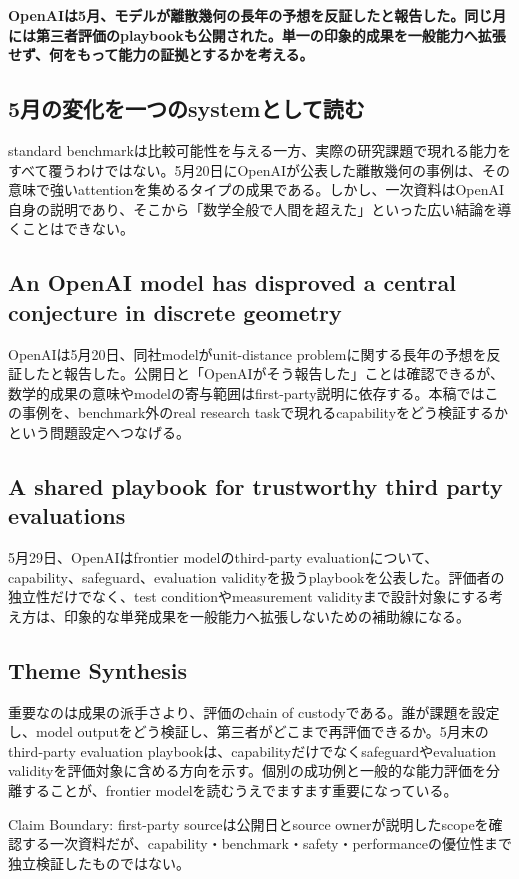 \noindent\textbf{OpenAIは5月、モデルが離散幾何の長年の予想を反証したと報告した。同じ月には第三者評価のplaybookも公開された。単一の印象的成果を一般能力へ拡張せず、何をもって能力の証拠とするかを考える。}\autocite{src-1c93d6c1c725,src-8c84b8422093}

\subsection{5月の変化を一つのsystemとして読む}

standard benchmarkは比較可能性を与える一方、実際の研究課題で現れる能力をすべて覆うわけではない。5月20日にOpenAIが公表した離散幾何の事例は、その意味で強いattentionを集めるタイプの成果である。しかし、一次資料はOpenAI自身の説明であり、そこから「数学全般で人間を超えた」といった広い結論を導くことはできない。\autocite{src-1c93d6c1c725,src-8c84b8422093}


\subsection{An OpenAI model has disproved a central conjecture in discrete geometry}

OpenAIは5月20日、同社modelがunit-distance problemに関する長年の予想を反証したと報告した。公開日と「OpenAIがそう報告した」ことは確認できるが、数学的成果の意味やmodelの寄与範囲はfirst-party説明に依存する。本稿ではこの事例を、benchmark外のreal research taskで現れるcapabilityをどう検証するかという問題設定へつなげる。\autocite{src-1c93d6c1c725}


\subsection{A shared playbook for trustworthy third party evaluations}

5月29日、OpenAIはfrontier modelのthird-party evaluationについて、capability、safeguard、evaluation validityを扱うplaybookを公表した。評価者の独立性だけでなく、test conditionやmeasurement validityまで設計対象にする考え方は、印象的な単発成果を一般能力へ拡張しないための補助線になる。\autocite{src-8c84b8422093}


\subsection{Theme Synthesis}

重要なのは成果の派手さより、評価のchain of custodyである。誰が課題を設定し、model outputをどう検証し、第三者がどこまで再評価できるか。5月末のthird-party evaluation playbookは、capabilityだけでなくsafeguardやevaluation validityを評価対象に含める方向を示す。個別の成功例と一般的な能力評価を分離することが、frontier modelを読むうえでますます重要になっている。\autocite{src-1c93d6c1c725,src-8c84b8422093}


\begin{claimboundary}
Claim Boundary: first-party sourceは公開日とsource ownerが説明したscopeを確認する一次資料だが、capability・benchmark・safety・performanceの優位性まで独立検証したものではない。\autocite{src-1c93d6c1c725,src-8c84b8422093}
\end{claimboundary}
